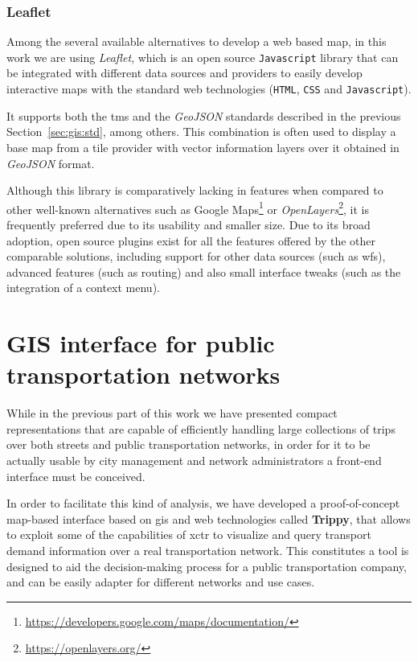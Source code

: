     \subsection{Leaflet}
    Among the several available alternatives to develop a web based map, in this work we are using {\em Leaflet}, which is an open source \texttt{Javascript} library that can be integrated with different data sources and providers to easily develop interactive maps with the standard web technologies (\texttt{HTML}, \texttt{CSS} and \texttt{Javascript}).
    
    It supports both the \gls{tms} and the {\em GeoJSON} standards described in the previous Section~\ref{sec:gis:std}, among others. This combination is often used to display a base map from a tile provider with vector information layers over it obtained in {\em GeoJSON} format.
    
    Although this library is comparatively lacking in features when compared to other well-known alternatives such as Google Maps\footnote{\url{https://developers.google.com/maps/documentation/}} or {\em OpenLayers}\footnote{\url{https://openlayers.org/}}, it is frequently preferred due to its usability and smaller size. Due to its broad adoption, open source plugins exist for all the features offered by the other comparable solutions, including support for other data sources (such as \gls{wfs}), advanced features (such as routing) and also small interface tweaks (such as the integration of a context menu).
    

\chapter{GIS interface for public transportation networks}
\label{sec:gis}
	While in the previous part of this work we have presented compact representations that are capable of efficiently handling large collections of trips over both streets and public transportation networks, in order for it to be actually usable by city management and network administrators a front-end interface must be conceived.
	
	In order to facilitate this kind of analysis, we have developed a proof-of-concept map-based interface based on \gls{gis} and web technologies called \textbf{Trippy}, that allows to exploit some of the capabilities of \gls{xctr} to visualize and query transport demand information over a real transportation network. This constitutes a tool is designed to aid the decision-making process for a public transportation company, and can be easily adapter for different networks and use cases.
	
